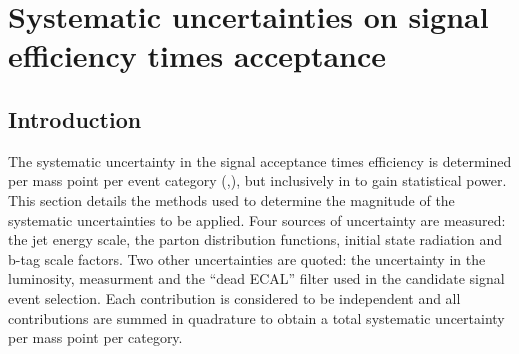 %

\clearpage
\section{Systematic uncertainties on signal efficiency times 
  acceptance\label{sec:sms-syst}}

\subsection{Introduction} 

The systematic uncertainty in the signal acceptance times efficiency
is determined per mass point per event category (\njet,\nb), but inclusively
in \scalht to gain statistical power. This section details the methods 
used to determine the magnitude of the systematic uncertainties to be applied. 
Four sources of uncertainty are measured: the jet energy scale,
the parton distribution functions, initial state radiation and b-tag scale
factors. Two other uncertainties are quoted: the uncertainty in the luminosity, 
measurment and the ``dead ECAL'' filter used in the candidate signal
event selection. Each contribution is considered to be independent 
and all contributions are summed in quadrature to obtain a total 
systematic uncertainty per mass point per category.

